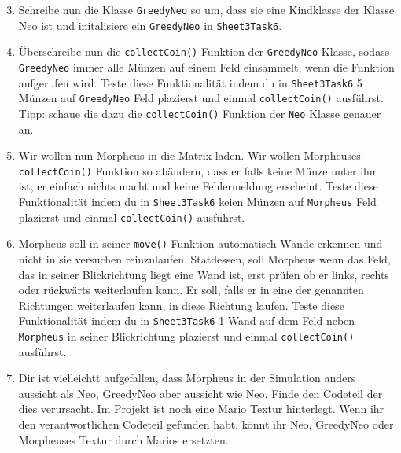 \begin{enumerate}\setcounter{enumi}{2}
\item Schreibe nun die Klasse \lstinline{GreedyNeo} so um, dass sie eine Kindklasse der Klasse Neo ist und initalisiere ein \lstinline{GreedyNeo} in \lstinline{Sheet3Task6}.

\item Überschreibe nun die \lstinline{collectCoin()} Funktion der \lstinline{GreedyNeo} Klasse, sodass \lstinline{GreedyNeo} immer alle Münzen auf einem Feld einsammelt, wenn die Funktion aufgerufen wird. Teste diese Funktionalität indem du in \lstinline{Sheet3Task6} 5 Münzen auf \lstinline{GreedyNeo} Feld plazierst und einmal \lstinline{collectCoin()} ausführst.\\

Tipp: schaue die dazu die \lstinline{collectCoin()} Funktion der \lstinline{Neo} Klasse genauer an.

\item Wir wollen nun Morpheus in die Matrix laden. Wir wollen Morpheuses \lstinline{collectCoin()} Funktion so abändern, dass er falls keine Münze unter ihm ist, er einfach nichts macht und keine Fehlermeldung erscheint. Teste diese Funktionalität indem du in \lstinline{Sheet3Task6} keien Münzen auf \lstinline{Morpheus} Feld plazierst und einmal \lstinline{collectCoin()} ausführst.\\
\item Morpheus soll in seiner \lstinline{move()} Funktion automatisch Wände erkennen und nicht in sie versuchen reinzulaufen. Statdessen, soll Morpheus wenn das Feld, das in seiner Blickrichtung liegt eine Wand ist, erst prüfen ob er links, rechts oder rückwärts weiterlaufen kann. Er soll, falls er in eine der genannten Richtungen weiterlaufen kann, in diese Richtung laufen. Teste diese Funktionalität indem du in \lstinline{Sheet3Task6} 1 Wand auf dem Feld neben \lstinline{Morpheus} in seiner Blickrichtung plazierst und einmal \lstinline{collectCoin()} ausführst.\\
\item \optional Dir ist vielleichtt aufgefallen, dass Morpheus in der Simulation anders aussieht als Neo, GreedyNeo aber aussieht wie Neo. Finde den Codeteil der dies verursacht. Im Projekt ist noch eine Mario Textur hinterlegt. Wenn ihr den verantwortlichen Codeteil gefunden habt, könnt ihr Neo, GreedyNeo oder Morpheuses Textur durch Marios ersetzten.
\end{enumerate}



